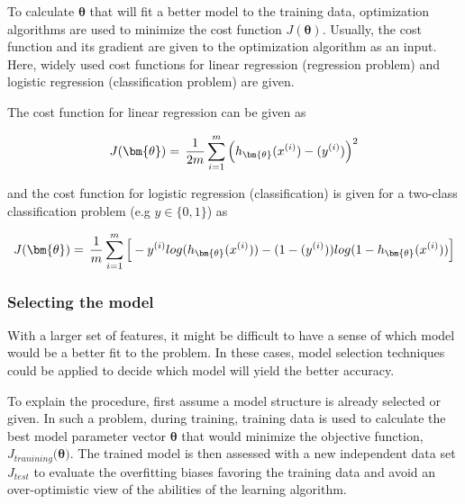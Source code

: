 To calculate $\bm{\theta}$ that will fit a better model to the training data, optimization algorithms are used to minimize the cost function $J({\bm{\theta}})$.
Usually, the cost function and its gradient are given to the optimization algorithm as an input. 
Here, widely used cost functions for linear regression (regression problem) and logistic regression (classification problem) are given. 

The cost function for linear regression can be given as

\begin{equation}{\label{eqn:costFuncLinearRegression}}
J({\bm{\theta}})
=\,
\frac{1}{2m} \sum\limits_{i=1}^{m} \Big(h_{\bm{\theta}}(x^{(i)}) - (y^{(i)})\Big)^2  
\end{equation} 

and the cost function for logistic regression (classification) is given for a two-class classification problem (e.g $y \in \{0,1\}$) as 

\begin{equation}{\label{eqn:costFuncLogisticRegression}}
J({\bm{\theta}})
=\,
\frac{1}{m} \sum\limits_{i=1}^{m} \Big[-y^{(i)}log(h_{\bm{\theta}}(x^{(i)})) - (1-(y^{(i)}))log(1-h_{\bm{\theta}}(x^{(i)}))\Big]
\end{equation} 


\subsubsection{Selecting the model}

With a larger set of features, it might be difficult to have a sense of which model would be a better fit to the problem. 
In these cases, model selection techniques could be applied to decide which model will yield the better accuracy.

To explain the procedure, first assume a model structure is already selected or given. 
In such a problem, during training, training data is used to calculate the best model parameter vector $\bm{\theta}$ that would minimize the objective function, $J_{tranining}(\bm{\theta)}$.
The trained model is then assessed with a new independent data set $J_{test}$ to evaluate the overfitting biases favoring the training data and avoid an over-optimistic view of the abilities of the learning algorithm. 



